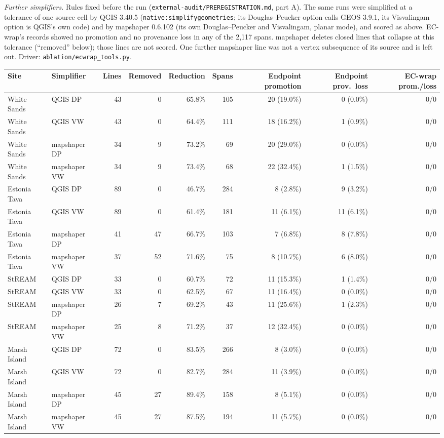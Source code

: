 \documentclass[11pt]{article}
\begin{document}
\vspace{4mm}
\noindent\emph{Further simplifiers.} Rules fixed before the run (\texttt{external-audit/PREREGISTRATION.md}, part A). The same runs were simplified at a tolerance of one source cell by QGIS 3.40.5 (\texttt{native:simplifygeometries}; its Douglas--Peucker option calls GEOS 3.9.1, its Visvalingam option is QGIS's own code) and by mapshaper 0.6.102 (its own Douglas--Peucker and Visvalingam, planar mode), and scored as above. EC-wrap's records showed no promotion and no provenance loss in any of the 2,117 spans. mapshaper deletes closed lines that collapse at this tolerance (``removed'' below); those lines are not scored. One further mapshaper line was not a vertex subsequence of its source and is left out. Driver: \texttt{ablation/ecwrap\_tools.py}.

\begin{center}\scriptsize\setlength{\tabcolsep}{4pt}
\begin{tabular}{@{}llrrrrrrr@{}}
\toprule
Site & Simplifier & Lines & Removed & Reduction & Spans & Endpoint promotion & Endpoint prov.\ loss & EC-wrap prom./loss \\
\midrule
White Sands & QGIS DP & 43 & 0 & 65.8\% & 105 & 20 (19.0\%) & 0 (0.0\%) & 0/0 \\
White Sands & QGIS VW & 43 & 0 & 64.4\% & 111 & 18 (16.2\%) & 1 (0.9\%) & 0/0 \\
White Sands & mapshaper DP & 34 & 9 & 73.2\% & 69 & 20 (29.0\%) & 0 (0.0\%) & 0/0 \\
White Sands & mapshaper VW & 34 & 9 & 73.4\% & 68 & 22 (32.4\%) & 1 (1.5\%) & 0/0 \\
Estonia Tava & QGIS DP & 89 & 0 & 46.7\% & 284 & 8 (2.8\%) & 9 (3.2\%) & 0/0 \\
Estonia Tava & QGIS VW & 89 & 0 & 61.4\% & 181 & 11 (6.1\%) & 11 (6.1\%) & 0/0 \\
Estonia Tava & mapshaper DP & 41 & 47 & 66.7\% & 103 & 7 (6.8\%) & 8 (7.8\%) & 0/0 \\
Estonia Tava & mapshaper VW & 37 & 52 & 71.6\% & 75 & 8 (10.7\%) & 6 (8.0\%) & 0/0 \\
StREAM & QGIS DP & 33 & 0 & 60.7\% & 72 & 11 (15.3\%) & 1 (1.4\%) & 0/0 \\
StREAM & QGIS VW & 33 & 0 & 62.5\% & 67 & 11 (16.4\%) & 0 (0.0\%) & 0/0 \\
StREAM & mapshaper DP & 26 & 7 & 69.2\% & 43 & 11 (25.6\%) & 1 (2.3\%) & 0/0 \\
StREAM & mapshaper VW & 25 & 8 & 71.2\% & 37 & 12 (32.4\%) & 0 (0.0\%) & 0/0 \\
Marsh Island & QGIS DP & 72 & 0 & 83.5\% & 266 & 8 (3.0\%) & 0 (0.0\%) & 0/0 \\
Marsh Island & QGIS VW & 72 & 0 & 82.7\% & 284 & 11 (3.9\%) & 0 (0.0\%) & 0/0 \\
Marsh Island & mapshaper DP & 45 & 27 & 89.4\% & 158 & 8 (5.1\%) & 0 (0.0\%) & 0/0 \\
Marsh Island & mapshaper VW & 45 & 27 & 87.5\% & 194 & 11 (5.7\%) & 0 (0.0\%) & 0/0 \\
\bottomrule
\end{tabular}
\end{center}
\end{document}
